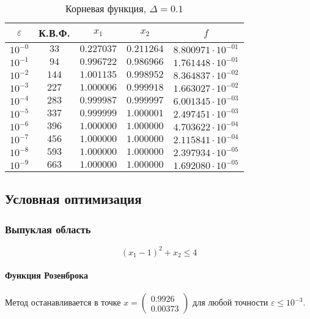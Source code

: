 \documentclass[a4paper,12pt,notitlepage,pdftex,headsepline]{scrartcl}
\begin{document}
        \begin{table}[ht]
          \centering
          \caption{Корневая функция, $\Delta = 0.1$}
          \begin{tabular}{|c|c|c|c|c|}
            \hline
            $\varepsilon$ & К.В.Ф. & $x_1$ & $x_2$ & $f$\\
            \hline
            $10^{-0}$ & $33$ & $0.227037$ & $0.211264$ & $8.800971\cdot 10^{-01}$\\
            $10^{-1}$ & $94$ & $0.996722$ & $0.986966$ & $1.761448\cdot 10^{-01}$\\
            $10^{-2}$ & $144$ & $1.001135$ & $0.998952$ & $8.364837\cdot 10^{-02}$\\
            $10^{-3}$ & $227$ & $1.000006$ & $0.999918$ & $1.663027\cdot 10^{-02}$\\
            $10^{-4}$ & $283$ & $0.999987$ & $0.999997$ & $6.001345\cdot 10^{-03}$\\
            $10^{-5}$ & $337$ & $0.999999$ & $1.000001$ & $2.497451\cdot 10^{-03}$\\
            $10^{-6}$ & $396$ & $1.000000$ & $1.000000$ & $4.703622\cdot 10^{-04}$\\
            $10^{-7}$ & $456$ & $1.000000$ & $1.000000$ & $2.115841\cdot 10^{-04}$\\
            $10^{-8}$ & $593$ & $1.000000$ & $1.000000$ & $2.397934\cdot 10^{-05}$\\
            $10^{-9}$ & $663$ & $1.000000$ & $1.000000$ & $1.692080\cdot 10^{-05}$\\
            \hline
          \end{tabular}
        \end{table}

        \clearpage
  \subsection{Условная оптимизация}
    \subsubsection{Выпуклая область}
      \[
        \left(x_1-1\right)^2 + x_2 \leqslant 4
      \]

      \paragraph{Функция Розенброка}
        Метод останавливается в точке $x = \left(\begin{matrix} 0.9926\\
          0.00373\end{matrix}\right)$ для любой точности $\varepsilon
          \leqslant 10^{-3}$.
\end{document}
